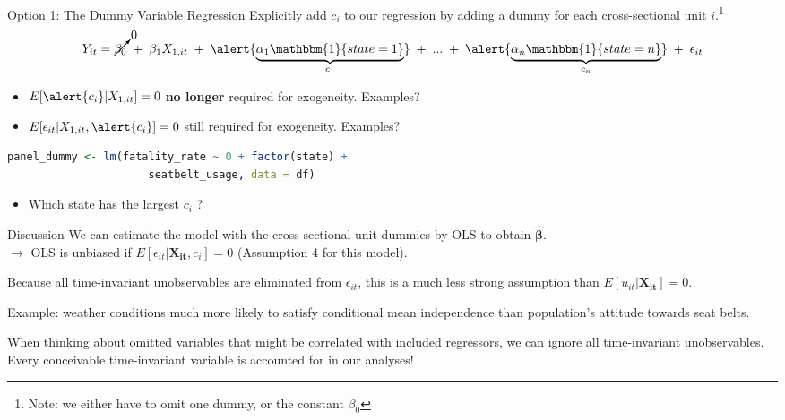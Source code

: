 \documentclass[11pt, aspectratio = 169]{beamer}
\begin{document}
\begin{frame}[fragile]{Option 1: The Dummy Variable Regression}
Explicitly add $c_i$ to our regression by adding a \alert{dummy} for each cross-sectional unit $i$.\footnote{Note: we either have to omit one dummy, or the constant $\beta_0$} 
\vspace{-0.2cm}
\begin{align*}
       Y_{it} = \cancelto{0}{\beta_0} \; + \;\beta_1 X_{1,it} \; + \; \alert{\underbrace{\alpha_1 \mathbbm{1}\{state = 1\}}_{c_1}} \; + \; ... \; + \; \alert{\underbrace{\alpha_n \mathbbm{1}\{state = n\}}_{c_n}}
       \; + \; \epsilon_{it} %
\end{align*}
\pause
\vspace{-0.9cm}
\begin{itemize}
    \item $E[\alert{c_i}|X_{1,it}] = 0$ \textbf{no longer} required for exogeneity. Examples? \pause
    \item $E[\epsilon_{it}|X_{1,it}, \alert{c_i}] = 0$ still required for exogeneity.   Examples?
\end{itemize}
\pause
\vspace{0.2cm}
\begin{lstlisting}[language=R]
    panel_dummy <- lm(fatality_rate ~ 0 + factor(state) + 
                      seatbelt_usage, data = df)
\end{lstlisting}
\pause
\vspace{-0.2cm}
\begin{itemize}
    \item[$\rightarrow$] Which state has the largest $c_i$ ? 
\end{itemize}
\end{frame}

\begin{frame}{Discussion}
We can estimate the model with the cross-sectional-unit-dummies by  OLS to obtain $\hat{\boldsymbol{\beta}}$. \\
$\rightarrow$ OLS is unbiased if $E[\epsilon_{it}|\boldsymbol{X_{it}}, c_i] = 0$ (Assumption 4 for this model).

Because all time-invariant unobservables are eliminated from $\epsilon_{it}$, this is a much less strong assumption than $E[u_{it}|\boldsymbol{X_{it}}] = 0$.

Example: weather conditions much more likely to satisfy conditional mean independence than population's attitude towards seat belts.

When thinking about omitted variables that might be correlated with included regressors, we can ignore all time-invariant unobservables.  Every conceivable time-invariant variable is accounted for in our analyses!
\end{frame}
\end{document}
